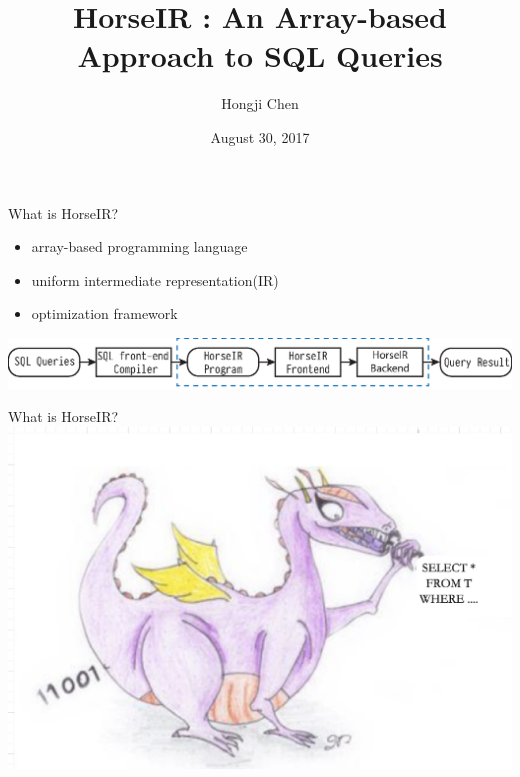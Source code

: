 \documentclass{beamer}
\title{HorseIR : An Array-based Approach to SQL Queries}
\author{Hongji Chen}
\date{August 30, 2017}
\begin{document}
\maketitle


\begin{frame}{What is HorseIR?}
\begin{itemize}
    \item array-based programming language   
    \item uniform intermediate representation(IR) 
    \item optimization framework 
\end{itemize}
\vskip 0.5in
\includegraphics[width=\textwidth]{horse-flow}
\end{frame}

\begin{frame}{What is HorseIR?}
\centering
\includegraphics[width=\textwidth]{logo-dragon}
\end{frame}
\end{document}
